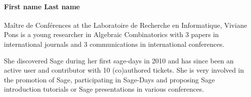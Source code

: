 \paragraph{First name Last name}

%

%

Maître de Conférences at the Laboratoire de Recherche en Informatique, 
Viviane Pons is a young researcher in Algebraic Combinatorics with 3
papers in international journals and 3 communications in
international conferences.

She discovered Sage during her first sage-days in 2010 and has since 
been an active user and contributor with 10 (co)authored tickets. She is
very involved in the promotion of Sage, participating in Sage-Days and 
proposing Sage introduction tutorials or Sage presentations in 
various conferences. 
